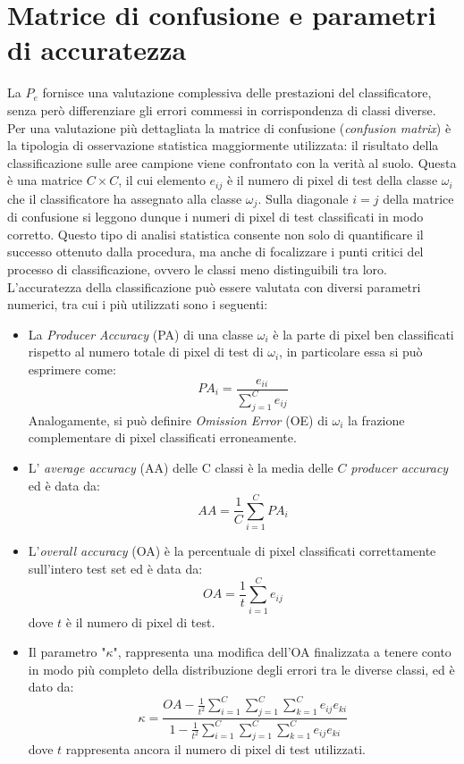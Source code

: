 \section{Matrice di confusione e parametri di accuratezza}
La $P_e$ fornisce una valutazione complessiva delle prestazioni del classificatore, senza però differenziare gli errori commessi in corrispondenza di classi diverse. Per una valutazione più dettagliata la matrice di confusione (\emph{confusion matrix}) è la tipologia di osservazione statistica maggiormente utilizzata: il risultato della classificazione sulle aree campione viene confrontato con la verità al suolo. Questa è una matrice $C \times C$, il cui elemento $e_{ij}$ è il numero di pixel di test della classe $\omega_i$ che il classificatore ha assegnato alla classe $\omega_j$. Sulla diagonale $i=j$ della matrice di confusione si leggono dunque i numeri di pixel di test classificati in modo corretto. Questo tipo di analisi statistica consente non solo di quantificare il successo ottenuto dalla procedura, ma anche di focalizzare i punti critici del processo di classificazione, ovvero le classi meno distinguibili tra loro. \\
L'accuratezza della classificazione può essere valutata con diversi parametri numerici, tra cui i più utilizzati sono i seguenti:
\begin{itemize}
\item La \emph{Producer Accuracy} (PA) di una classe $\omega_i$ è la
parte di pixel ben classificati rispetto al numero totale di
pixel di test di $\omega_i$, in particolare essa si può esprimere
come:
\begin{equation}
\label{eq:PA}
PA_i=\dfrac{e_{ii}}{\sum_{j=1}^Ce_{ij}}
\end{equation}
Analogamente, si può definire \emph{Omission Error} (OE) di $\omega_i$ la frazione complementare di pixel classificati erroneamente.
\item L' \emph{average accuracy} (AA) delle C classi è la media delle $C$ \emph{producer accuracy} ed è data da:
\begin{equation}
\label{eq:AA}
AA=\dfrac{1}{C}\sum_{i=1}^C{PA_i}
\end{equation}
\item L'\emph{overall accuracy }(OA) è la percentuale di pixel classificati correttamente sull'intero test set ed è data da:
\begin{equation}
\label{eq:OA}
OA= \dfrac{1}{t}\sum_{i=1}^C e_{ij}
\end{equation}
dove $t$ è il numero di pixel di test.
\item Il parametro "$\kappa$", rappresenta una modifica dell'OA finalizzata a tenere conto in modo più completo della distribuzione degli errori tra le diverse classi, ed è dato da:
\begin{equation}
\label{eq:K}
\kappa=\dfrac{OA-\frac{1}{t^2}\sum_{i=1}^C\sum_{j=1}^C\sum_{k=1}^C e_{ij}e_{ki}}{1-\frac{1}{t^2}\sum_{i=1}^C\sum_{j=1}^C\sum_{k=1}^C e_{ij} e_{ki}}
\end{equation}
dove $t$ rappresenta ancora il numero di pixel di test utilizzati.
\end{itemize}


